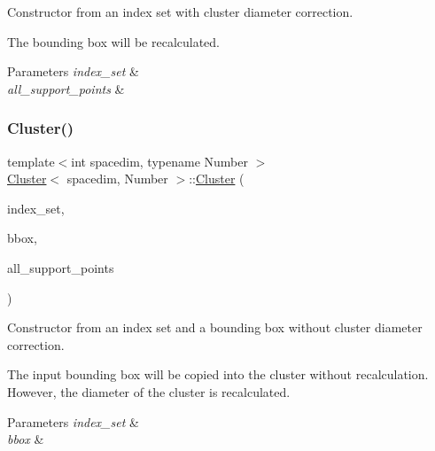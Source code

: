 Constructor from an index set with cluster diameter correction.

The bounding box will be recalculated. 
\begin{DoxyParams}{Parameters}
{\em index\+\_\+set} & \\
\hline
{\em all\+\_\+support\+\_\+points} & \\
\hline
\end{DoxyParams}
\mbox{\label{classCluster_aaa9ac4c5b6df1633980e45c3076e17e0}} 
\subsubsection{\texorpdfstring{Cluster()}{Cluster()}\hspace{0.1cm}{\footnotesize\ttfamily [5/7]}}
{\footnotesize\ttfamily template$<$int spacedim, typename Number $>$ \\
\hyperlink{classCluster}{Cluster}$<$ spacedim, Number $>$\+::\hyperlink{classCluster}{Cluster} (\begin{DoxyParamCaption}\item[{const std\+::vector$<$ types\+::global\+\_\+dof\+\_\+index $>$ \&}]{index\+\_\+set,  }\item[{const \hyperlink{classSimpleBoundingBox}{Simple\+Bounding\+Box}$<$ spacedim, Number $>$ \&}]{bbox,  }\item[{const std\+::vector$<$ Point$<$ spacedim, Number $>$$>$ \&}]{all\+\_\+support\+\_\+points }\end{DoxyParamCaption})}

Constructor from an index set and a bounding box without cluster diameter correction.

The input bounding box will be copied into the cluster without recalculation. However, the diameter of the cluster is recalculated. 
\begin{DoxyParams}{Parameters}
{\em index\+\_\+set} & \\
\hline
{\em bbox} & \\
\hline
\end{DoxyParams}
\mbox{\label{classCluster_adf806cf8bccb891707d8e7d4c345518b}} 
